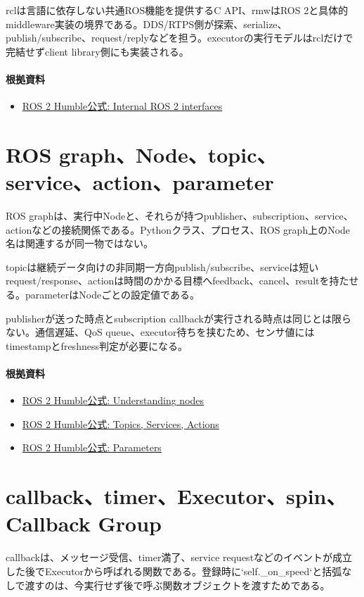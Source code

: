 \documentclass[a4paper,11pt]{article}
\begin{document}
rclは言語に依存しない共通ROS機能を提供するC API、rmwはROS 2と具体的middleware実装の境界である。DDS/RTPS側が探索、serialize、publish/subscribe、request/replyなどを担う。executorの実行モデルはrclだけで完結せずclient library側にも実装される。

\paragraph{根拠資料}
\begin{itemize}[leftmargin=1.6em]
\item \href{https://docs.ros.org/en/humble/Concepts/About-Internal-Interfaces.html}{ROS 2 Humble公式: Internal ROS 2 interfaces}
\end{itemize}

\section{ROS graph、Node、topic、service、action、parameter}
ROS graphは、実行中Nodeと、それらが持つpublisher、subscription、service、actionなどの接続関係である。Pythonクラス、プロセス、ROS graph上のNode名は関連するが同一物ではない。


topicは継続データ向けの非同期一方向publish/subscribe、serviceは短いrequest/response、actionは時間のかかる目標へfeedback、cancel、resultを持たせる。parameterはNodeごとの設定値である。


publisherが送った時点とsubscription callbackが実行される時点は同じとは限らない。通信遅延、QoS queue、executor待ちを挟むため、センサ値にはtimestampとfreshness判定が必要になる。

\paragraph{根拠資料}
\begin{itemize}[leftmargin=1.6em]
\item \href{https://docs.ros.org/en/humble/Tutorials/Beginner-CLI-Tools/Understanding-ROS2-Nodes/Understanding-ROS2-Nodes.html}{ROS 2 Humble公式: Understanding nodes}
\item \href{https://docs.ros.org/en/humble/Concepts/Basic/Interfaces-Topics-Services-Actions.html}{ROS 2 Humble公式: Topics, Services, Actions}
\item \href{https://docs.ros.org/en/humble/Concepts/Basic/About-Parameters.html}{ROS 2 Humble公式: Parameters}
\end{itemize}

\section{callback、timer、Executor、spin、Callback Group}
callbackは、メッセージ受信、timer満了、service requestなどのイベントが成立した後でExecutorから呼ばれる関数である。登録時に`self.\_on\_speed`と括弧なしで渡すのは、今実行せず後で呼ぶ関数オブジェクトを渡すためである。
\end{document}
